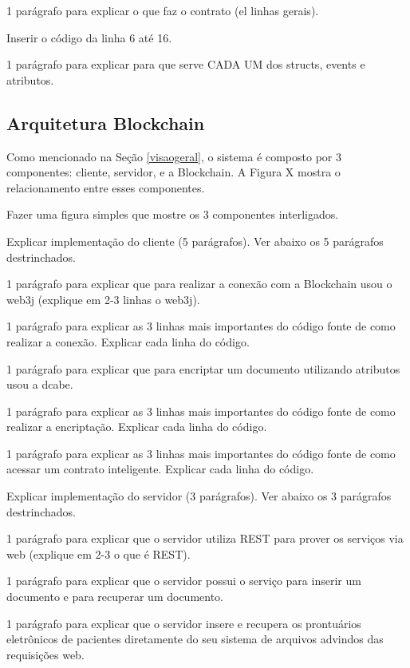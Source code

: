 \documentclass[a4paper,11pt]{article}
\begin{document}
{\color{Magenta} 1 parágrafo para explicar o que faz o contrato (el linhas gerais).}

{\color{Magenta} Inserir o código da linha 6 até 16.}

{\color{Magenta} 1 parágrafo para explicar para que serve CADA UM dos structs, events e atributos.}



\subsection{Arquitetura Blockchain}

Como mencionado na Seção \ref{visaogeral}, o sistema é composto por 3 componentes: cliente, servidor, e a Blockchain. A Figura X mostra o relacionamento entre esses componentes. 

{\color{ForestGreen} Fazer uma figura simples que mostre os 3 componentes interligados. }


{\color{ForestGreen} Explicar implementação do cliente (5 parágrafos). Ver abaixo os 5 parágrafos destrinchados. }

{\color{Magenta} 1 parágrafo para explicar que para realizar a conexão com a Blockchain usou o web3j (explique em 2-3 linhas o web3j).}

{\color{Magenta} 1 parágrafo para explicar as 3 linhas mais importantes do código fonte de como realizar a conexão. Explicar cada linha do código. }

{\color{Magenta} 1 parágrafo para explicar que para encriptar um documento utilizando atributos usou a dcabe.}

{\color{Magenta} 1 parágrafo para explicar as 3 linhas mais importantes do código fonte de como realizar a encriptação. Explicar cada linha do código.}

{\color{Magenta} 1 parágrafo para explicar as 3 linhas mais importantes do código fonte de como acessar um contrato inteligente. Explicar cada linha do código.}

{\color{ForestGreen} Explicar implementação do servidor (3 parágrafos). Ver abaixo os 3 parágrafos destrinchados. }

{\color{Magenta} 1 parágrafo para explicar que o servidor utiliza REST para prover os serviços via web  (explique em 2-3 o que é REST).}

{\color{Magenta} 1 parágrafo para explicar que o servidor possui o serviço para inserir um documento e para recuperar um documento.}

{\color{Magenta} 1 parágrafo para explicar que o servidor insere e recupera os prontuários eletrônicos de pacientes diretamente do seu sistema de arquivos advindos das requisições web.}
\end{document}
